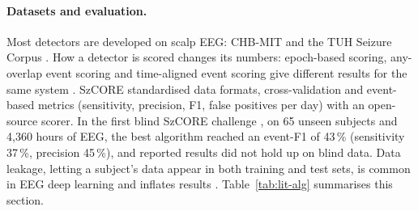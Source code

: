 \paragraph{Datasets and evaluation.} Most detectors are developed on scalp EEG: CHB-MIT and the TUH Seizure Corpus
\cite{shah2018tusz}. How a detector is scored changes its numbers: epoch-based scoring, any-overlap event scoring and
time-aligned event scoring give different results for the same system \cite{ziyabari2017metrics}. SzCORE
\cite{dan2024szcore} standardised data formats, cross-validation and event-based metrics (sensitivity, precision, F1,
false positives per day) with an open-source scorer. In the first blind SzCORE challenge
\cite{dan2025szcorechallenge}, on 65 unseen subjects and 4,360 hours of EEG, the best algorithm reached an event-F1 of
43\,\% (sensitivity 37\,\%, precision 45\,\%), and reported results did not hold up on blind data. Data leakage,
letting a subject's data appear in both training and test sets, is common in EEG deep learning and inflates results
\cite{brookshire2024leakage}. Table~\ref{tab:lit-alg} summarises this section.

